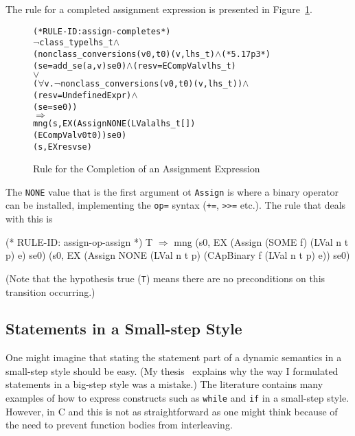 \documentclass[11pt]{article}
\begin{document}
%
The rule for a completed assignment expression is presented in
Figure~\ref{fig:assign-completes}.
\begin{figure}[htbp]
\begin{center}
%
\begin{minipage}{\textwidth}
\begin{alltt}
(* RULE-ID: assign-completes *)
    \(\neg\)class_type lhs_t \(\land\)
    (nonclass_conversion s (v0,t0) (v,lhs_t) \(\land\) (* 5.17 p3 *)
     (se = add_se (a, v) se0) \(\land\) (resv = ECompVal v lhs_t)
                          \(\lor\)
     (\(\forall\)v. \(\neg\)nonclass_conversion s (v0, t0) (v, lhs_t)) \(\land\)
     (resv = UndefinedExpr) \(\land\)
     (se = se0))
   \(\Rightarrow\)
     mng (s, EX (Assign NONE (LVal a lhs_t [])
                             (ECompVal v0 t0)) se0)
         (s, EX resv se)
\end{alltt}
\end{minipage}
\end{center}
\caption{Rule for the Completion of an Assignment Expression}
\label{fig:assign-completes}
\end{figure}
The \texttt{NONE} value that is the first argument ot \texttt{Assign}
is where a binary operator can be installed, implementing the
\texttt{op=} syntax (\texttt{+=}, \texttt{>>=} etc.).  The rule that
deals with this is
%
\begin{stdrule}
(* RULE-ID: assign-op-assign *)
     T
   \(\Rightarrow\)
     mng (s0, EX (Assign (SOME f) (LVal n t p) e) se0)
         (s0, EX (Assign NONE
                         (LVal n t p)
                         (CApBinary f (LVal n t p) e)) se0)

\end{stdrule}
(Note that the hypothesis true (\texttt{T}) means there are no
preconditions on this transition occurring.)



\subsection{Statements in a Small-step Style}
\label{sec:small-step-stmts}

One might imagine that stating the statement part of a dynamic
semantics in a small-step style should be easy.  (My
thesis~\cite[\S7.1]{Norrish98} explains why the way I formulated
statements in a big-step style was a mistake.) The literature contains
many examples of how to express constructs such as \texttt{while} and
\texttt{if} in a small-step style.  However, in C and \cpp{} this is
not as straightforward as one might think because of the need to
prevent function bodies from interleaving.
\end{document}
